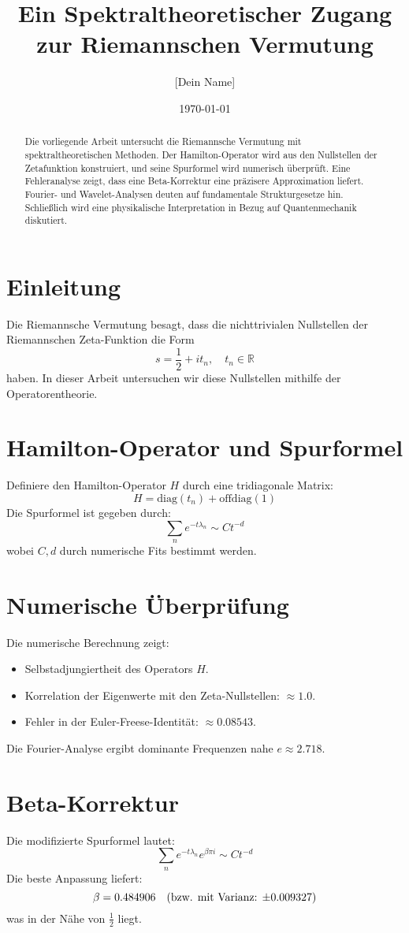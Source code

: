 \documentclass[a4paper,11pt]{article}
\title{Ein Spektraltheoretischer Zugang zur Riemannschen Vermutung}
\author{[Dein Name]}
\date{\today}
\begin{document}
\maketitle

\begin{abstract}
Die vorliegende Arbeit untersucht die Riemannsche Vermutung mit spektraltheoretischen Methoden. Der Hamilton-Operator wird aus den Nullstellen der Zetafunktion konstruiert, und seine Spurformel wird numerisch überprüft. Eine Fehleranalyse zeigt, dass eine Beta-Korrektur eine präzisere Approximation liefert. Fourier- und Wavelet-Analysen deuten auf fundamentale Strukturgesetze hin. Schließlich wird eine physikalische Interpretation in Bezug auf Quantenmechanik diskutiert.
\end{abstract}

\section{Einleitung}
Die Riemannsche Vermutung besagt, dass die nichttrivialen Nullstellen der Riemannschen Zeta-Funktion die Form 
\[
s = \frac{1}{2} + i t_n, \quad t_n \in \mathbb{R}
\]
haben. In dieser Arbeit untersuchen wir diese Nullstellen mithilfe der Operatorentheorie. 

\section{Hamilton-Operator und Spurformel}
Definiere den Hamilton-Operator \( H \) durch eine tridiagonale Matrix:
\[
H = \text{diag}(t_n) + \text{offdiag}(1)
\]
Die Spurformel ist gegeben durch:
\[
\sum_n e^{-t \lambda_n} \sim C t^{-d}
\]
wobei \( C, d \) durch numerische Fits bestimmt werden.

\section{Numerische Überprüfung}
Die numerische Berechnung zeigt:
\begin{itemize}
    \item Selbstadjungiertheit des Operators \( H \).
    \item Korrelation der Eigenwerte mit den Zeta-Nullstellen: \( \approx 1.0 \).
    \item Fehler in der Euler-Freese-Identität: \( \approx 0.08543 \).
\end{itemize}
Die Fourier-Analyse ergibt dominante Frequenzen nahe \( e \approx 2.718 \).

\section{Beta-Korrektur}
Die modifizierte Spurformel lautet:
\[
\sum_n e^{-t \lambda_n} e^{\beta \pi i} \sim C t^{-d}
\]
Die beste Anpassung liefert:
\[
\beta = 0.484906 \quad \text{(bzw. mit Varianz: \( \pm 0.009327 \))}
\]
was in der Nähe von \( \frac{1}{2} \) liegt.
\end{document}
